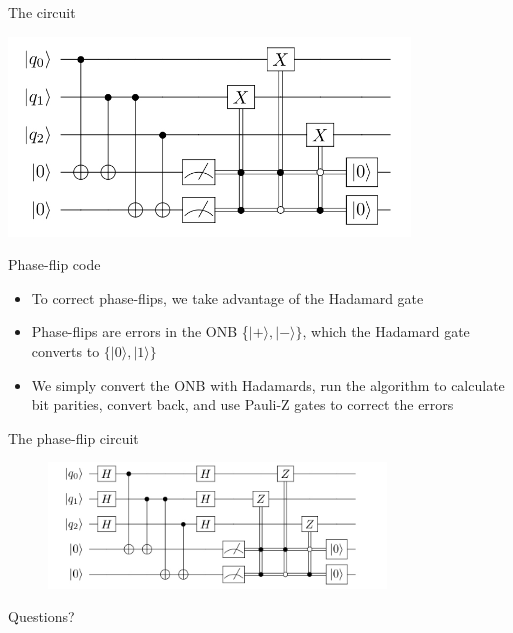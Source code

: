 \documentclass[aspectratio=169, handout]{beamer}
\begin{document}
\begin{frame}{The circuit}
\begin{center}
    \includegraphics[width=0.8\textwidth]{bitflipcode.png}\nocite{site:xkcd}
\end{center}
\end{frame}

\begin{frame}{Phase-flip code}
    \begin{itemize}
        \item To correct phase-flips, we take advantage of the Hadamard gate \pause
        \item Phase-flips are errors in the ONB \{$|+\rangle, |-\rangle\}$, which the Hadamard gate converts to $\{|0\rangle, |1\rangle\}$ \pause
        \item We simply convert the ONB with Hadamards, run the algorithm to calculate bit parities, convert back, and use Pauli-Z gates to correct the errors
    \end{itemize}
\end{frame}

\begin{frame}{The phase-flip circuit}
    \begin{figure}
        \centering
        \includegraphics[width=0.8\textwidth]{phaseflipcode.png}
    \end{figure}
\end{frame}
\begin{frame}{}
      \begin{center}
    {\color{sigma@mainblue} \LARGE Questions?}
  \end{center}
\end{frame}
\end{document}
